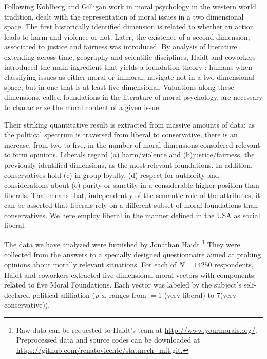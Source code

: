 \documentclass[twocolumn,showpacs]{revtex4-1}
\begin{document}
Following  Kohlberg \cite{Kohlberg} and  Gilligan \cite{Gilligan}
work in moral psychology in the western world tradition, dealt with 
the representation of moral issues in a two dimensional space.
The first historically identified dimension is
related to whether an action leads to harm and violence
or not. Later, the existence of a second dimension, associated to
justice and fairness was introduced.
By analysis of literature  extending across time, geography and  scientific disciplines, 
Haidt and coworkers introduced the  main ingredient that yields a
foundation theory \cite{Haidt1}: humans when
classifying issues as either moral or immoral, 
navigate not in a two dimensional space, but in one that is at least
five  dimensional. 
Valuations along these dimensions,  called foundations 
in the literature of moral psychology, are 
necessary to characterize the moral content of a given issue. 
 
Their striking quantitative result is extracted from massive amounts of
data: as the political spectrum is traversed from liberal to conservative, there is an increase, from 
two to five, in the number of  moral dimensions considered relevant 
to form opinions.
Liberals regard (a) harm/violence
 and (b)justice/fairness, the
previously identified dimensions, as the most relevant foundations. 
In addition, conservatives hold  (c) in-group loyalty, (d) respect for authority
and  considerations about (e) purity or sanctity in a 
considerable higher position than liberals.
That means that, independently of the semantic role of the attributes, 
it can be asserted that 
liberals rely on a different subset of moral foundations than
conservatives. We here employ liberal in the manner defined in the USA
as social liberal.   

The data we have analyzed were furnished by Jonathan Haidt \cite{Haidt1,Graham} \footnote{Raw data can be requested to Haidt's team at \href{http://www.yourmorals.org/}{http://www.yourmorals.org/}. Preprocessed data and source codes can be downloaded at
 \href{https://github.com/renatovicente/statmech_mft.git }{https://github.com/renatovicente/statmech\_mft.git.}} They were
collected from the answers to a specially designed 
 questionnaire aimed at probing opinions about 
morally relevant situations. 
For each of $N=14250$ respondents, Haidt and coworkers extracted 
five dimensional moral vectors with components 
related to five Moral Foundations. Each vector was labeled 
by the subject's self-declared political affiliation ({\it p.a.} ranges from
$=1$ (very liberal) to $7$(very conservative)).
\end{document}
